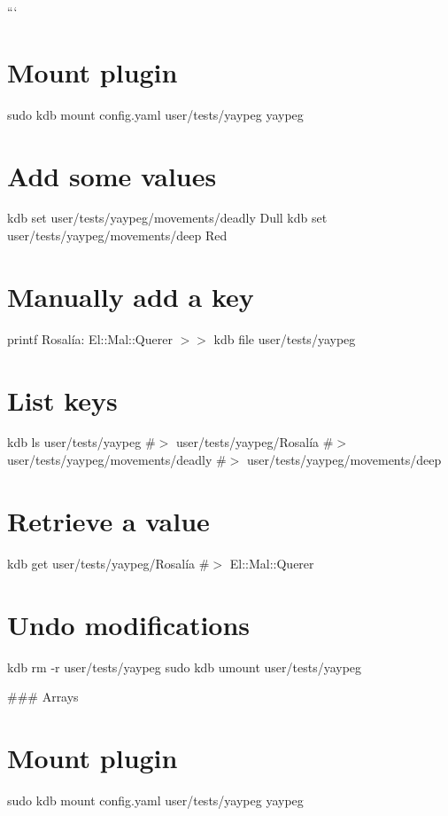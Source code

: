 ``` \section*{Mount plugin}

sudo kdb mount config.\+yaml user/tests/yaypeg yaypeg

\section*{Add some values}

kdb set user/tests/yaypeg/movements/deadly \textquotesingle{}Dull\textquotesingle{} kdb set user/tests/yaypeg/movements/deep \textquotesingle{}Red\textquotesingle{}

\section*{Manually add a key}

printf \textquotesingle{}Rosalía\+: El\+::\+Mal\+::\+Querer\textquotesingle{} $>$$>$ {\ttfamily kdb file user/tests/yaypeg}

\section*{List keys}

kdb ls user/tests/yaypeg \#$>$ user/tests/yaypeg/\+Rosalía \#$>$ user/tests/yaypeg/movements/deadly \#$>$ user/tests/yaypeg/movements/deep

\section*{Retrieve a value}

kdb get user/tests/yaypeg/\+Rosalía \#$>$ El\+::\+Mal\+::\+Querer

\section*{Undo modifications}

kdb rm -\/r user/tests/yaypeg sudo kdb umount user/tests/yaypeg 
\begin{DoxyCode}
### Arrays
\end{DoxyCode}
 \section*{Mount plugin}

sudo kdb mount config.\+yaml user/tests/yaypeg yaypeg

